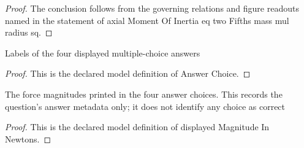 \begin{proof}
  The conclusion follows from the governing relations and figure readouts named in the statement of axial Moment Of Inertia eq two Fifths mass mul radius sq.
\end{proof}
\begin{definition}
  \label{def:physics:phyx-mini-0825:phyxminiproblems-problemphyxmini0825-answerchoice}
  Labels of the four displayed multiple-choice answers
\end{definition}
\begin{proof}
  This is the declared model definition of Answer Choice.
\end{proof}
\begin{definition}
  \label{def:physics:phyx-mini-0825:phyxminiproblems-problemphyxmini0825-answerchoice-displayedmagnitudeinnewtons}
  The force magnitudes printed in the four answer choices. This records the question's answer metadata only; it does not identify any choice as correct
\end{definition}
\begin{proof}
  This is the declared model definition of displayed Magnitude In Newtons.
\end{proof}
